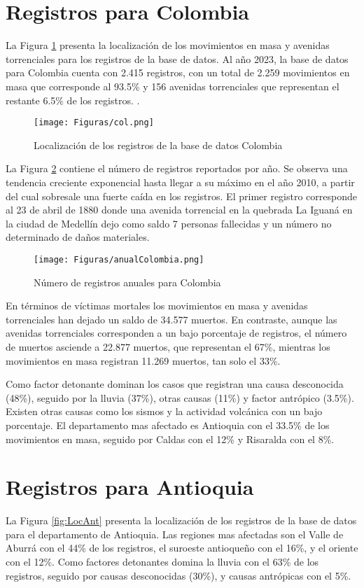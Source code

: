 \documentclass{article}
\begin{document}
\section{Registros para Colombia}
La Figura \ref{fig:locCol} presenta la localización de los movimientos en masa y avenidas torrenciales para los registros de la base de datos. Al año 2023, la base de datos para Colombia cuenta con 2.415 registros, con un total de 2.259 movimientos en masa que corresponde al 93.5\%  y 156 avenidas torrenciales que representan el restante 6.5\% de los registros. .

\begin{figure}[ht!]
    \centering
      {\texttt{[image: Figuras/col.png]}}
    \caption{Localización de los registros de la base de datos Colombia}
    \label{fig:locCol}
\end{figure}

La Figura \ref{fig:AnualCol} contiene el número de registros reportados por año. Se observa una tendencia creciente exponencial hasta llegar a su máximo en el año 2010, a partir del cual sobresale una fuerte caída en los registros. El primer registro corresponde al 23 de abril de 1880 donde una avenida torrencial en la quebrada La Iguaná en la ciudad de Medellín dejo como saldo 7 personas fallecidas y un número no determinado de daños materiales.

\begin{figure}[ht!]
    \centering
      {\texttt{[image: Figuras/anualColombia.png]}}
    \caption{Número de registros anuales para Colombia}
    \label{fig:AnualCol}
\end{figure}

En términos de víctimas mortales los movimientos en masa y avenidas torrenciales han dejado un saldo de 34.577 muertos. En contraste, aunque las avenidas torrenciales corresponden a un bajo porcentaje de registros, el número de muertos asciende a 22.877 muertos, que representan el 67\%, mientras los movimientos en masa registran 11.269 muertos, tan solo el 33\%. 

Como factor detonante dominan los casos que registran una causa desconocida (48\%), seguido por la lluvia (37\%), otras causas (11\%) y factor antrópico (3.5\%). Existen otras causas como los sismos y la actividad volcánica con un bajo porcentaje. El departamento mas afectado es Antioquia con el 33.5\% de los movimientos en masa, seguido por Caldas con el 12\% y Risaralda con el 8\%.

\section{Registros para Antioquia}
La Figura \ref{fig:LocAnt} presenta la localización de los registros de la base de datos para el departamento de Antioquia. Las regiones mas afectadas son el Valle de Aburrá con el 44\% de los registros, el suroeste antioqueño con el 16\%, y el oriente con el 12\%. Como factores detonantes domina la lluvia con el 63\% de los registros, seguido por causas desconocidas (30\%), y causas antrópicas con el 5\%.
\end{document}
